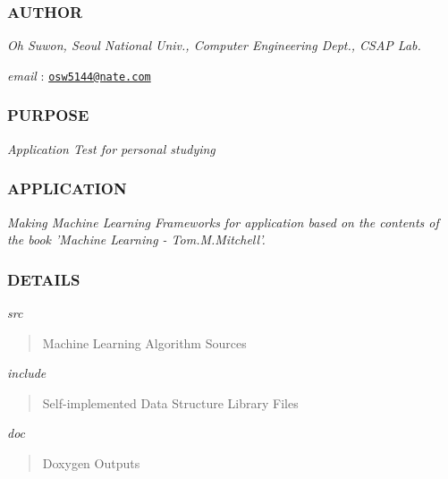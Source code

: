 \subsubsection*{A\-U\-T\-H\-O\-R}

{\itshape Oh Suwon, Seoul National Univ., Computer Engineering Dept., C\-S\-A\-P Lab.}

{\itshape email} \-: \href{mailto:osw5144@nate.com}{\tt osw5144@nate.\-com}

\subsubsection*{P\-U\-R\-P\-O\-S\-E}

{\itshape Application Test for personal studying}

\subsubsection*{A\-P\-P\-L\-I\-C\-A\-T\-I\-O\-N}

{\itshape Making Machine Learning Frameworks for application based on the contents of the book 'Machine Learning -\/ Tom.\-M.\-Mitchell'.}

\subsubsection*{D\-E\-T\-A\-I\-L\-S}

{\itshape src} \begin{quotation}
Machine Learning Algorithm Sources

\end{quotation}


{\itshape include} \begin{quotation}
Self-\/implemented Data Structure Library Files

\end{quotation}


{\itshape doc} \begin{quotation}
Doxygen Outputs \end{quotation}
